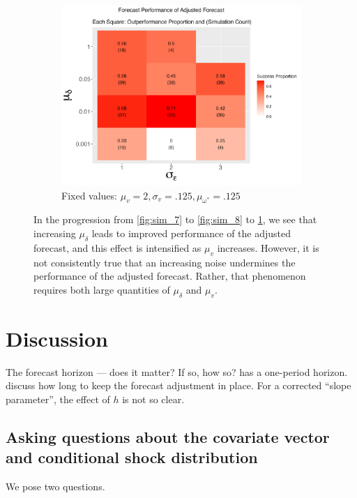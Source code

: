\documentclass[11pt]{article}
\theoremstyle{definition}
\begin{document}
\begin{figure}[!h]
      \begin{subfigure}{.44\linewidth} 
        \centering
          \includegraphics[scale=.42]{simulation_plots/Nov27_160348_2024_mudelta_sigmaepsilon.png}
          \caption{Fixed values: $\mu_{v} = 2, \sigma_{v} = .125, \mu_{\omega^{*}} = .125$}\label{fig:sim_9}
      \end{subfigure}
      
          \caption{In the progression from \ref{fig:sim_7} to \ref{fig:sim_8} to \ref{fig:sim_9}, we see that increasing $\mu_{\delta}$ leads to improved performance of the adjusted forecast, and this effect is intensified as $\mu_{v}$ increases.  However, it is not consistently true that an increasing noise undermines the performance of the adjusted forecast.  Rather, that phenomenon requires both large quantities of $\mu_{\delta}$ and $\mu_{v}$.}
          \label{fig:set_of_three_three}
        \end{figure}
  \clearpage 

\section{Discussion}

The forecast horizon --- does it matter?  If so, how so?  \cite{lin2021minimizing} has a one-period horizon.  \cite[p. 203]{clements1998forecasting} discuss how long to keep the forecast adjustment in place.  For a corrected ``slope parameter'', the effect of $h$ is not so clear.\\

\subsection{Asking questions about the covariate vector and conditional shock distribution}
We pose two questions.  
\end{document}
